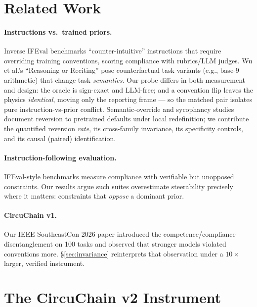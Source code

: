 \documentclass[11pt]{article}
\begin{document}
\section{Related Work}
\label{sec:related}

\paragraph{Instructions vs.\ trained priors.}
Inverse IFEval \cite{inverseifeval2025} benchmarks ``counter-intuitive''
instructions that require overriding training conventions, scoring compliance
with rubrics/LLM judges. Wu et al.'s ``Reasoning or Reciting''
\cite{wu2024reasoning} pose counterfactual task variants (e.g., base-9
arithmetic) that change task \emph{semantics}. Our probe differs in both
measurement and design: the oracle is sign-exact and LLM-free; and a
convention flip leaves the physics \emph{identical}, moving only the reporting
frame --- so the matched pair isolates pure instruction-vs-prior conflict.
Semantic-override and sycophancy studies \cite{semanticoverride2026}
document reversion to pretrained defaults under local redefinition; we
contribute the quantified reversion \emph{rate}, its cross-family invariance,
its specificity controls, and its causal (paired) identification.

\paragraph{Instruction-following evaluation.}
IFEval-style benchmarks measure compliance with verifiable but unopposed
constraints. Our results argue such suites overestimate steerability
precisely where it matters: constraints that \emph{oppose} a dominant prior.

\paragraph{CircuChain v1.}
Our IEEE SoutheastCon 2026 paper \cite{ravishankara2026circuchain}
introduced the competence/compliance disentanglement on 100 tasks and observed
that stronger models violated conventions more. \S\ref{sec:invariance}
reinterprets that observation under a $10\times$ larger, verified instrument.

\section{The CircuChain v2 Instrument}
\label{sec:method}
\end{document}
